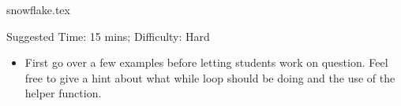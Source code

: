 \documentclass{exam}
\begin{document}
\begin{questions}
    {snowflake.tex}
    \begin{questionmeta}
        Suggested Time: 15 mins; Difficulty: Hard
        \begin{itemize}
        \item First go over a few examples before letting students work on question. Feel free to give a hint about what while loop should be doing and the use of the helper function. 
        \end{itemize}
    \end{questionmeta}
\end{questions}
\end{document}
